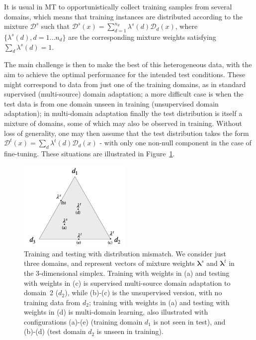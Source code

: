 \documentclass[11pt,a4paper]{article}
\newcommand{\vlambda}{\ensuremath{\boldsymbol\lambda}\xspace} %
\begin{document}
It is usual in MT to opportunistically collect training samples from several domains, which means that training instances are distributed according to the mixture $\mathcal{D}^s$ such that $\mathcal{D}^s(x) = \sum_{d=1}^{n_d} \lambda^{s}(d) \mathcal{D}_d(x)$, where $\{\lambda^{s}(d), d=1 \dots n_d\}$ are the corresponding mixture weights satisfying $\sum_d \lambda^{s}(d)=1$.

The main challenge is then to make the best of this heterogeneous data, with the aim to achieve the optimal performance for the intended test conditions. These might correspond to data from just one of the training domains, as in standard supervised (multi-source) domain adaptation; a more difficult case is when the test data is from one domain unseen in training (unsupervised domain adaptation); in multi-domain adaptation finally the test distribution is itself a mixture of domains, some of which may also be observed in training.  Without loss of generality, one may then assume that the test distribution takes the form $\mathcal{D}^{t}(x) = \sum_d \lambda^{t}(d) \mathcal{D}_d(x)$ - with only one non-null  component in the case of fine-tuning.
These situations are illustrated in Figure~\ref{fig:mdmt-lambdas}.
\begin{figure}[h]
  \centering
  \includegraphics[width=0.48\textwidth]{mdmt-lambdas}
  \caption{Training and testing with distribution mismatch. We consider just three domains, and represent vectors of mixture weights $\vlambda^{s}$ and $\vlambda^{t}$ in the 3-dimensional simplex. Training with weights in (a) and testing with weights in (c) is supervised multi-source domain adaptation to domain~2 ($d_2$), while (b)-(c) is the unsupervised version, with no training data from $d_2$; training with weights in (a) and testing with weights in (d) is multi-domain learning, also illustrated with configurations (a)-(e) (training domain $d_1$ is not seen in test), and (b)-(d)  (test domain $d_2$ is unseen in training).}\label{fig:mdmt-lambdas}
\end{figure}
\end{document}
